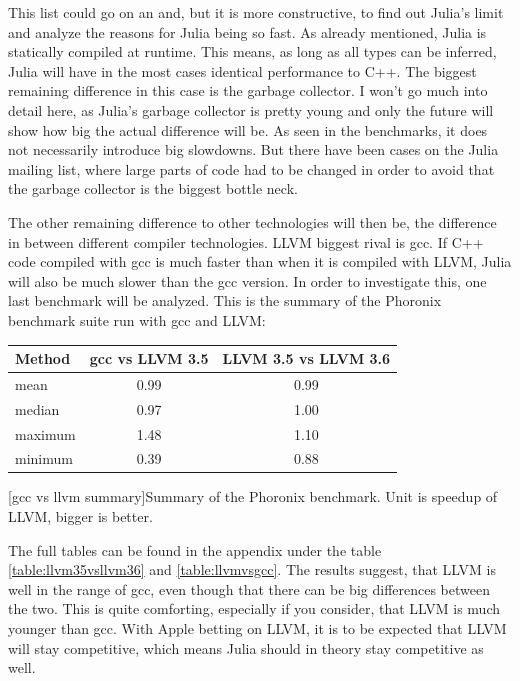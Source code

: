 This list could go on an and, but it is more constructive, to find out Julia's limit and analyze the reasons for Julia being so fast.
As already mentioned, Julia is statically compiled at runtime. This means, as long as all types can be inferred, Julia will have in the most cases identical performance to C++.
The biggest remaining difference in this case is the garbage collector. I won't go much into detail here, as Julia's garbage collector is pretty young and only the future will show how big the actual difference will be. As seen in the benchmarks, it does not necessarily introduce big slowdowns. But there have been cases on the Julia mailing list, where large parts of code had to be changed in order to avoid that the garbage collector is the biggest bottle neck.

The other remaining difference to other technologies will then be, the difference in between different compiler technologies.
\ac{LLVM} biggest rival is \ac{gcc}. If C++ code compiled with \ac{gcc} is much faster than when it is compiled with \ac{LLVM}, Julia will also be much slower than the \ac{gcc} version.
In order to investigate this, one last benchmark will be analyzed.
This is the summary of the Phoronix benchmark suite run with \ac{gcc} and \ac{LLVM}:
\begin{table}[ht]
  \centering
  \begin{tabular}{l|c|c}
    \hline
    \textbf{Method} & \textbf{\ac{gcc} vs \ac{LLVM} 3.5} & \textbf{\ac{LLVM} 3.5 vs \ac{LLVM} 3.6} \\
    \hline
    mean & 0.99 & 0.99 \\
    median & 0.97 & 1.00 \\
    maximum & 1.48 & 1.10 \\
    minimum & 0.39 & 0.88 \\
    \hline
  \end{tabular}
    [gcc vs llvm summary]{Summary of the Phoronix benchmark. Unit is speedup of LLVM, bigger is better. \cite{LLVM35vsLLVM36}\cite{LLVMvsGCC}\cite{Phoronix}}
    \label{table:gccvsllvm}
\end{table}

The full tables can be found in the appendix under the table \ref{table:llvm35vsllvm36} and \ref{table:llvmvsgcc}.
The results suggest, that \ac{LLVM} is well in the range of \ac{gcc}, even though that there can be big differences between the two.
This is quite comforting, especially if you consider, that LLVM is much younger than gcc. With Apple betting on LLVM, it is to be expected that \ac{LLVM} will stay competitive, which means Julia should in theory stay competitive as well.



